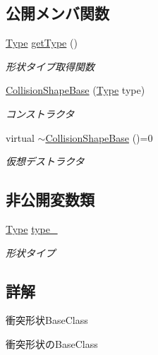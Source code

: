 \subsection*{公開メンバ関数}
\begin{DoxyCompactItemize}
\item 
\mbox{\hyperlink{class_collision_shape_base_a8abcef092855ad0ca191047044b002cb}{Type}} \mbox{\hyperlink{class_collision_shape_base_a3dac385b3718f80171046cde33da04b1}{get\+Type}} ()
\begin{DoxyCompactList}\small\item\em 形状タイプ取得関数 \end{DoxyCompactList}\item 
\mbox{\hyperlink{class_collision_shape_base_a9dd2ab42e2a6e96c6bff832ce8ca62b9}{Collision\+Shape\+Base}} (\mbox{\hyperlink{class_collision_shape_base_a8abcef092855ad0ca191047044b002cb}{Type}} type)
\begin{DoxyCompactList}\small\item\em コンストラクタ \end{DoxyCompactList}\item 
virtual \mbox{\hyperlink{class_collision_shape_base_af6fb40d8815d749743555bd2ab505fe6}{$\sim$\+Collision\+Shape\+Base}} ()=0
\begin{DoxyCompactList}\small\item\em 仮想デストラクタ \end{DoxyCompactList}\end{DoxyCompactItemize}
\subsection*{非公開変数類}
\begin{DoxyCompactItemize}
\item 
\mbox{\hyperlink{class_collision_shape_base_a8abcef092855ad0ca191047044b002cb}{Type}} \mbox{\hyperlink{class_collision_shape_base_a46413b1e4d4b3a35075232fa9012addb}{type\+\_\+}}
\begin{DoxyCompactList}\small\item\em 形状タイプ \end{DoxyCompactList}\end{DoxyCompactItemize}


\subsection{詳解}
衝突形状\+Base\+Class 

衝突形状の\+Base\+Class 

